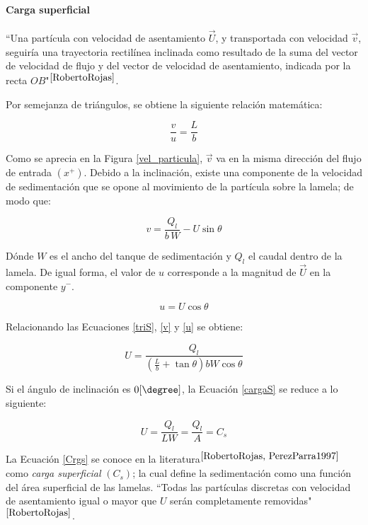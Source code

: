 \paragraph{Carga superficial}

\noindent
\justify

``Una part\'icula con velocidad de asentamiento $\vec{U}$, y transportada con velocidad $\vec{v}$, seguir\'ia una trayectoria rectil\'inea inclinada como resultado de la suma del vector de velocidad de flujo y del vector de velocidad de asentamiento, indicada por la recta $OB$"$^{\cite{RobertoRojas}}$.



\noindent
\justify

Por semejanza de tri\'angulos, se obtiene la siguiente relaci\'on matem\'atica:

\begin{equation}
	\frac{v}{u} = \frac{L}{b}
	\label{triS}
\end{equation}

\noindent
\justify

Como se aprecia en la Figura \ref{vel_particula}, $\vec{v}$ va en la misma direcci\'on del flujo de entrada $(x^{+})$. Debido a la inclinaci\'on, existe una componente de la velocidad de sedimentaci\'on que se opone al movimiento de la part\'icula sobre la lamela; de modo que:

\begin{equation}
	v = \frac{Q _l}{b \, W} - U \sin \theta
	\label{v}
\end{equation}

\noindent
\justify

D\'onde $W$ es el ancho del tanque de sedimentaci\'on y $Q_l$ el caudal dentro de la lamela. De igual forma, el valor de $u$ corresponde a la magnitud de $\vec{U}$ en la componente $y^{-}$.

\begin{equation}
	u = U \cos \theta
	\label{u}
\end{equation}

\noindent
\justify

Relacionando las Ecuaciones \ref{triS}, \ref{v} y \ref{u} se obtiene:

\begin{equation}
	\boxed{U = \frac{Q_l}{\left(\frac{L}{b} +  \tan \theta \right) b W \cos \theta } }
	\label{cargaS}
\end{equation}

\noindent
\justify

Si el \'angulo de inclinaci\'on es $0 [\degree]$, la Ecuaci\'on \ref{cargaS} se reduce a lo siguiente:

\begin{equation}
	U = \frac{Q_l}{L W} = \frac{Q_l}{A} = C_s
	\label{Crgs}
\end{equation}

\noindent
\justify

La Ecuaci\'on \ref{Crgs} se conoce en la literatura$^{\cite{RobertoRojas, PerezParra1997}}$ como \textit{carga superficial} $(C_s)$; la cual define la sedimentaci\'on como una funci\'on del \'area superficial de las lamelas. ``Todas las part\'iculas discretas con velocidad de asentamiento igual o mayor que $U$ ser\'an completamente removidas"$^{\cite{RobertoRojas}}$.
